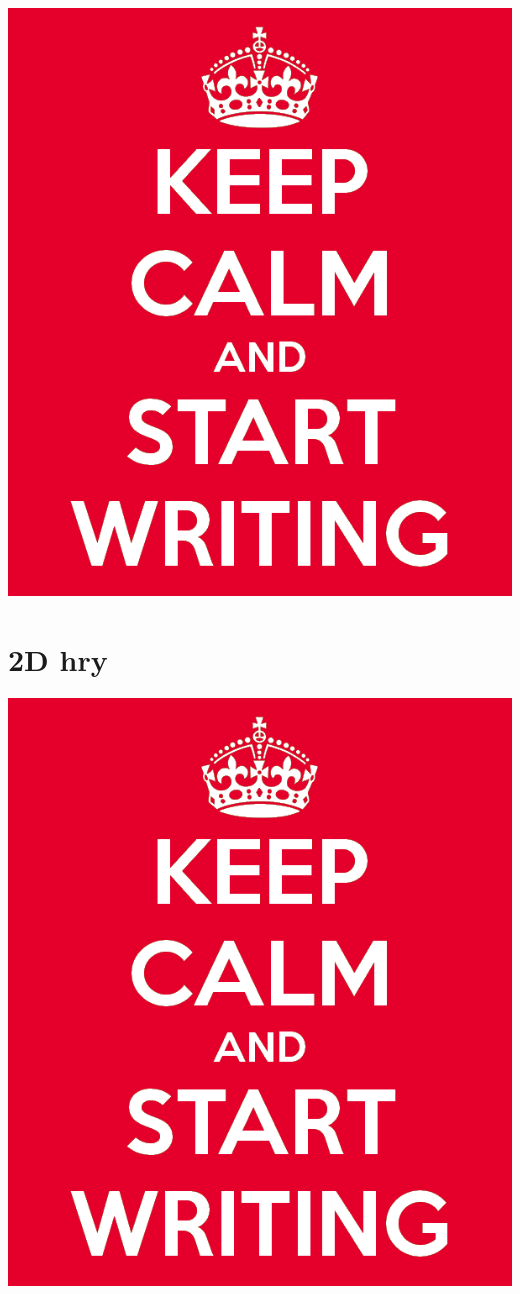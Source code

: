 \includegraphics[scale=0.3]{obrazky-figures/keep-calm.png}

\textcolor{gray}{\blindtext[23]}


\section{2D hry}

\textcolor{gray}{\blindtext[18]}
\includegraphics[scale=0.3]{obrazky-figures/keep-calm.png}

